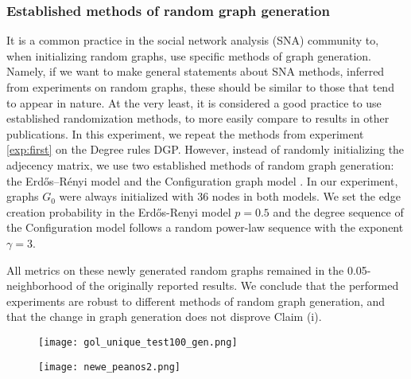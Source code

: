 \subsubsection{Established methods of random graph generation}
\label{exp:our1}
It is a common practice in the social network analysis (SNA) community to, when initializing random graphs, use specific methods of graph generation. Namely, if we want to make general statements about SNA methods, inferred from experiments on random graphs, these should be similar to those that tend to appear in nature. At the very least, it is considered a good practice to use established randomization methods, to more easily compare to results in other publications. In this experiment, we repeat the methods from experiment \ref{exp:first} on the Degree rules DGP. However, instead of randomly initializing the adjecency matrix, we use two established methods of random graph generation: the Erdős–Rényi model \cite{erdHos1959renyi} and the Configuration graph model \cite{newman2003structure}. In our experiment, graphs $G_{0}$ were always initialized with 36 nodes in both models. We set the edge creation probability in the Erdős-Renyi model $p=0.5$ and the degree sequence of the Configuration model follows a random power-law sequence with the exponent $\gamma = 3$.

All metrics on these newly generated random graphs remained in the 0.05-neighborhood of the originally reported results. We conclude that the performed experiments are robust to different methods of random graph generation, and that the change in graph generation does not disprove Claim (i).


\begin{figure}[t]
\begin{minipage}{0.42\textwidth}
\begin{center}
    \texttt{[image: gol\_unique\_test100\_gen.png]}
  \end{center}
  \label{fig:golBoxPlot}
\end{minipage}
\hfill
\begin{minipage}{0.52\textwidth}
\begin{center}
    \texttt{[image: newe\_peanos2.png]}
  \end{center}
  \label{fig:PeanoProblem}
  \vspace{5mm}
\end{minipage}
\end{figure}


